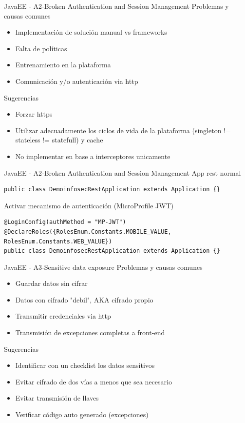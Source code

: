 \documentclass[aspectratio=169]{beamer}
\begin{document}
\begin{frame}{JavaEE - A2-Broken Authentication and Session Management}
    Problemas y causas comunes
    \begin{itemize}
        \item Implementación de solución manual vs frameworks
        \item Falta de políticas 
        \item Entrenamiento en la plataforma
        \item Comunicación y/o autenticación via http
    \end{itemize}
    
    Sugerencias
    \begin{itemize}
        \item Forzar https
        \item Utilizar adecuadamente los ciclos de vida de la plataforma (singleton != stateless != statefull) y cache
        \item No implementar en base a interceptores unicamente
    \end{itemize}
\end{frame}

\begin{frame}[fragile]{JavaEE - A2-Broken Authentication and Session Management}
App rest normal
\begin{lstlisting}
public class DemoinfosecRestApplication extends Application {}
\end{lstlisting}	
    
Activar mecanismo de autenticación (MicroProfile JWT)
\begin{lstlisting}
@LoginConfig(authMethod = "MP-JWT")
@DeclareRoles({RolesEnum.Constants.MOBILE_VALUE, RolesEnum.Constants.WEB_VALUE})
public class DemoinfosecRestApplication extends Application {}
\end{lstlisting}	

\end{frame}



\begin{frame}{JavaEE - A3-Sensitive data exposure}
    Problemas y causas comunes
    \begin{itemize}
        \item Guardar datos sin cifrar
        \item Datos con cifrado "debil", AKA cifrado propio
        \item Transmitir credenciales via http
        \item Transmisión de excepciones completas a front-end
    \end{itemize}
    
    Sugerencias
    \begin{itemize}
        \item Identificar con un checklist los datos sensitivos
        \item Evitar cifrado de dos vías a menos que sea necesario
        \item Evitar transmisión de llaves
        \item Verificar código auto generado (excepciones)
    \end{itemize}
\end{frame}
\end{document}
